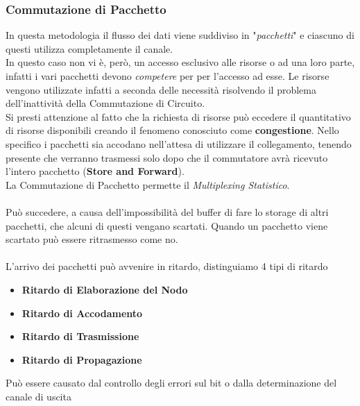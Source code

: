 \documentclass{article}
\newcounter{subsubsubsection}[subsubsection]
\begin{document}
            \subsubsection{Commutazione di Pacchetto}
                In questa metodologia il flusso dei dati viene suddiviso in "\textit{pacchetti}" e ciascuno di questi utilizza completamente il canale.\\
                In questo caso non vi è, però, un accesso esclusivo alle risorse o ad una loro parte, infatti i vari pacchetti devono \textit{competere} per per l'accesso ad esse. Le risorse vengono utilizzate infatti a seconda delle necessità risolvendo il problema dell'inattività della Commutazione di Circuito.\\
                Si presti attenzione al fatto che la richiesta di risorse può eccedere il quantitativo di risorse disponibili creando il fenomeno conosciuto come \textbf{congestione}. Nello specifico i pacchetti sia accodano nell'attesa di utilizzare il collegamento, tenendo presente che verranno trasmessi solo dopo che il commutatore avrà ricevuto l'intero pacchetto (\textbf{Store and Forward}).\\
                La Commutazione di Pacchetto permette il \textit{Multiplexing Statistico}.\\
                \\
                Può succedere, a causa dell'impossibilità del buffer di fare lo storage di altri pacchetti, che alcuni di questi vengano scartati. Quando un pacchetto viene scartato può essere ritrasmesso come no.\\
                \\
                L'arrivo dei pacchetti può avvenire in ritardo, distinguiamo 4 tipi di ritardo
                \begin{itemize}
                    \item \textbf{Ritardo di Elaborazione del Nodo}
                    \item \textbf{Ritardo di Accodamento}
                    \item \textbf{Ritardo di Trasmissione}
                    \item \textbf{Ritardo di Propagazione}
                \end{itemize}

                    Può essere causato dal controllo degli errori sul bit o dalla determinazione del canale di uscita
\end{document}
